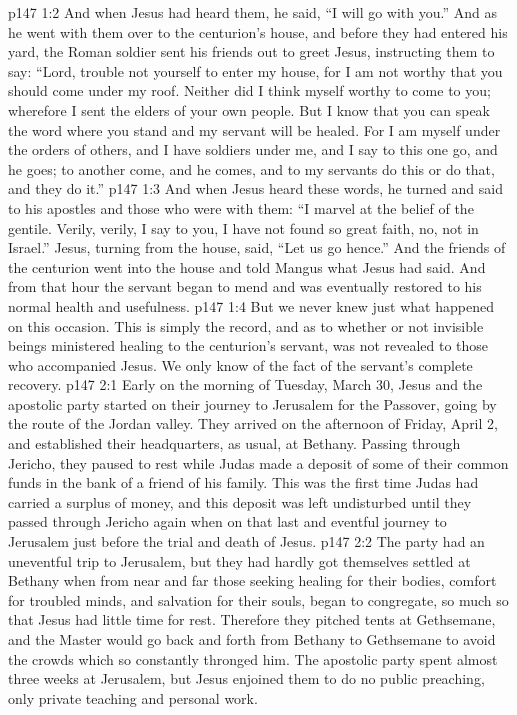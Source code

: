 \vs p147 1:2 And when Jesus had heard them, he said, \textcolor{ubdarkred}{“I will go with you.”} And as he went with them over to the centurion’s house, and before they had entered his yard, the Roman soldier sent his friends out to greet Jesus, instructing them to say: “Lord, trouble not yourself to enter my house, for I am not worthy that you should come under my roof. Neither did I think myself worthy to come to you; wherefore I sent the elders of your own people. But I know that you can speak the word where you stand and my servant will be healed. For I am myself under the orders of others, and I have soldiers under me, and I say to this one go, and he goes; to another come, and he comes, and to my servants do this or do that, and they do it.”\plusone
\vs p147 1:3 And when Jesus heard these words, he turned and said to his apostles and those who were with them: \textcolor{ubdarkred}{“I marvel at the belief of the gentile. Verily, verily, I say to you, I have not found so great faith, no, not in Israel.”} Jesus, turning from the house, said, \textcolor{ubdarkred}{“Let us go hence.”} And the friends of the centurion went into the house and told Mangus what Jesus had said. And from that hour the servant began to mend and was eventually restored to his normal health and usefulness.
\vs p147 1:4 But we never knew just what happened on this occasion. This is simply the record, and as to whether or not invisible beings ministered healing to the centurion’s servant, was not revealed to those who accompanied Jesus. We only know of the fact of the servant’s complete recovery.
\vs p147 2:1 Early on the morning of Tuesday, March 30, Jesus and the apostolic party started on their journey to Jerusalem for the Passover, going by the route of the Jordan valley. They arrived on the afternoon of Friday, April 2, and established their headquarters, as usual, at Bethany. Passing through Jericho, they paused to rest while Judas made a deposit of some of their common funds in the bank of a friend of his family. This was the first time Judas had carried a surplus of money, and this deposit was left undisturbed until they passed through Jericho again when on that last and eventful journey to Jerusalem just before the trial and death of Jesus.
\vs p147 2:2 The party had an uneventful trip to Jerusalem, but they had hardly got themselves settled at Bethany when from near and far those seeking healing for their bodies, comfort for troubled minds, and salvation for their souls, began to congregate, so much so that Jesus had little time for rest. Therefore they pitched tents at Gethsemane, and the Master would go back and forth from Bethany to Gethsemane to avoid the crowds which so constantly thronged him. The apostolic party spent almost three weeks at Jerusalem, but Jesus enjoined them to do no public preaching, only private teaching and personal work.\plusone
